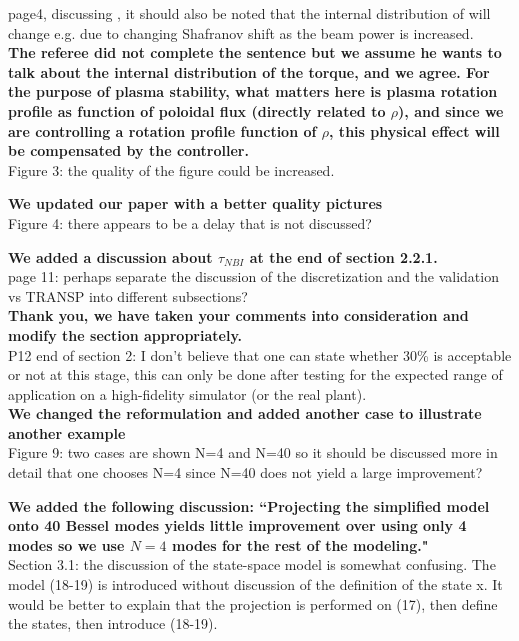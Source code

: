 \documentclass{scrartcl}
\newcommand{\response}[1]{\textcolor{red!80!black}{\bf #1}}
\begin{document}
page4, discussing , it should also be noted that the internal distribution of will change e.g. due to changing Shafranov shift as the beam power is increased.\\

\response{The referee did not complete the sentence but we assume he wants to talk about the internal distribution of the torque, and we agree. For the purpose of plasma stability, what matters here is plasma rotation profile as function of poloidal flux (directly related to $\rho$), and since we are controlling a rotation profile function of $\rho$, this physical effect will be compensated by the controller.} \\

Figure 3: the quality of the figure could be increased.

\response{We updated our paper with a better quality pictures}\\

Figure 4: there appears to be a delay that is not discussed?

\response{We added a discussion about $\tau_{NBI}$ at the end of section 2.2.1.} \\

page 11: perhaps separate the discussion of the discretization and the validation vs TRANSP into different subsections? \\
\response{Thank you, we have taken your comments into consideration and modify the section appropriately.}\\

P12 end of section 2: I don't believe that one can state whether 30\% is acceptable or not at this stage, this can only be done after testing for the expected range of application on a high-fidelity simulator (or the real plant). \\
\response{We changed the reformulation and added another case to illustrate another example}\\

Figure 9: two cases are shown N=4 and N=40 so it should be discussed more in detail that one chooses N=4 since N=40 does not yield a large improvement?

\response{We added the following discussion: ``Projecting the simplified model onto 40 Bessel modes yields little improvement over using only 4 modes so we use $N=4$ modes for the rest of the modeling."} \\

Section 3.1: the discussion of the state-space model is somewhat confusing. The model (18-19) is introduced without discussion of the definition of the state x. It would be better to explain that the projection is performed on (17), then define the states, then introduce (18-19).
\end{document}
